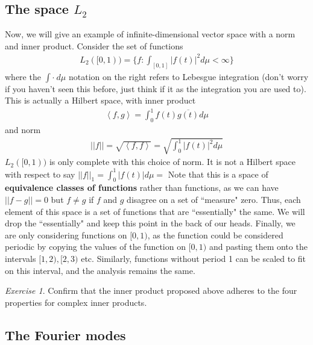 \documentclass[11pt]{article}
\newcommand{\ip}[2]{\left\langle #1, #2\right\rangle}
\theoremstyle{plain}
\theoremstyle{definition}
\theoremstyle{remark}
\newtheorem{exc}{Exercise}[section]
\begin{document}
\subsection*{The space $L_2$}

Now, we will give an example of infinite-dimensional vector space with a norm and inner product. Consider the set of functions
\begin{align*}
    L_2([0,1)) = \{f : \int_{[0,1]} |f(t)|^2 d\mu < \infty \}
\end{align*}
where the $\int \cdot \ d\mu$ notation on the right refers to Lebesgue integration (don't worry if you haven't seen this before, just think if it as the integration you are used to). This is actually a Hilbert space, with inner product
\begin{align*}
    \ip{f}{g} = \int_0^1 f(t)\overline{g(t)} d\mu
\end{align*}
and norm
\begin{align*}
    ||f|| = \sqrt{\ip{f}{f}} = \sqrt{\int_0^1 |f(t)|^2 d\mu}
\end{align*}
$L_2([0,1))$ is only complete with this choice of norm. It is not a Hilbert space with respect to say $||f||_1 = \int_0^1 |f(t)| d\mu = $ Note that this is a space of {\bf equivalence classes of functions} rather than functions, as we can have $||f-g|| = 0$ but $f \neq g$ if $f$ and $g$ disagree on a set of ``measure" zero. Thus, each element of this space is a set of functions that are ``essentially" the same. We will drop the ``essentially" and keep this point in the back of our heads. Finally, we are only considering functions on $[0, 1)$, as the function could be considered periodic by copying the values of the function on $[0, 1)$ and pasting them onto the intervals $[1, 2), [2,3)$ etc. Similarly, functions without period 1 can be scaled to fit on this interval, and the analysis remains the same.
\begin{exc}
    Confirm that the inner product proposed above adheres to the four properties for complex inner products.
\end{exc}

\subsection*{The Fourier modes}
\end{document}
